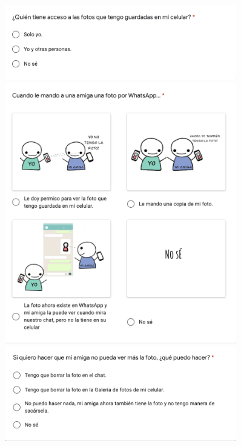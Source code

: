 \begin{figure}[H]
    \includegraphics[width=0.9\textwidth]{imagenes_anexo/l.png}
    \includegraphics[width=0.9\textwidth]{imagenes_anexo/m.png}
    \includegraphics[width=0.9\textwidth]{imagenes_anexo/n.png}
\end{figure}

